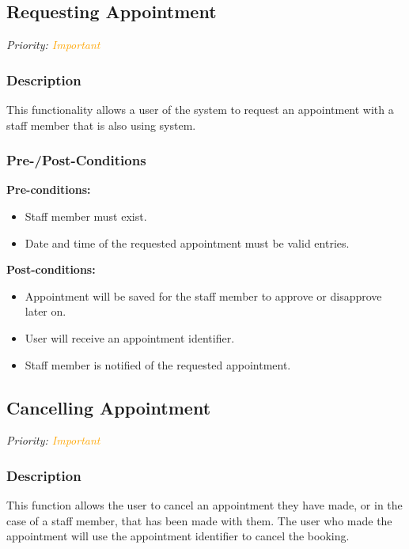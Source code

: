 \subsection{Requesting Appointment}
\textit{Priority: \textcolor{orange}{Important}} 

\subsubsection{Description}

This functionality allows a user of the system to request an appointment with a staff member that is also using system. 


\subsubsection{Pre-/Post-Conditions}
\textbf{Pre-conditions:} 
	\begin{itemize}
		\item Staff member must exist.
		\item Date and time of the requested appointment must be valid entries.
	\end{itemize}
\textbf{Post-conditions:} 
	\begin{itemize}
		\item Appointment will be saved for the staff member to approve or disapprove later on.
		\item User will receive an appointment identifier.
		\item Staff member is notified of the requested appointment. 
	\end{itemize}

\subsection{Cancelling Appointment}
\textit{Priority: \textcolor{orange}{Important}} 

\subsubsection{Description}
This function allows the user to cancel an appointment they have made, or in the case of a staff member, that has been made with them. The user who made the appointment will use the appointment identifier to cancel the booking. 


